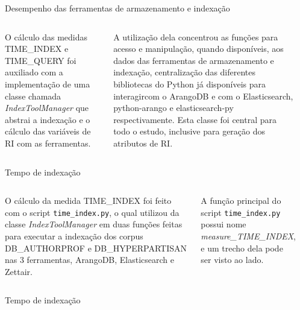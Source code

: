 \documentclass[%
  10pt,%
  aspectratio = 169,%
  compress,%
  t,%
]{beamer}%
\begin{document}
    \begin{frame}{}{Desempenho das ferramentas de armazenamento e indexação}
        \begin{columns}
            O cálculo das medidas TIME\_INDEX e TIME\_QUERY foi auxiliado com a implementação de uma classe chamada \textit{IndexToolManager} que abstrai a indexação e o cálculo das variáveis de RI com as ferramentas.
            
            A utilização dela concentrou as funções para acesso e manipulação, quando disponíveis, aos dados das ferramentas de armazenamento e indexação, centralização das diferentes bibliotecas do Python já disponíveis para interagircom o ArangoDB e com o Elasticsearch, python-arango e elasticsearch-py respectivamente.
            Esta classe foi central para todo o estudo, inclusive para geração dos atributos de RI.

                \vspace{-1.0cm}
                \inputminted[bgcolor=bg, fontsize=\scriptsize,
                baselinestretch=1, tabsize=2, breaklines]{python}{codes/indextoolmanager-reduced.py}
        \end{columns}
    \end{frame}
    
    \begin{frame}{}{Tempo de indexação}
        \begin{columns}
            O cálculo da medida TIME\_INDEX foi feito com o script \texttt{time\_index.py}, o qual utilizou da classe \textit{IndexToolManager} em duas funções feitas para executar a indexação dos corpus DB\_AUTHORPROF e DB\_HYPERPARTISAN nas 3 ferramentas, ArangoDB, Elasticsearch e Zettair.
            
            A função principal do script \texttt{time\_index.py} possui nome \textit{measure\_TIME\_INDEX}, e um trecho dela pode ser visto ao lado.

                \vspace{-1.0cm}
                \inputminted[bgcolor=bg, fontsize=\scriptsize,
                baselinestretch=1, tabsize=2, breaklines]{python}{codes/function-measure-TIME-INDEX.py}
        \end{columns}
    \end{frame}
    
    \begin{frame}{}{Tempo de indexação}
        \begin{columns}[T]
                \vspace{-0.5cm}
                
                \vspace{-0.5cm}
                
        \end{columns}
    \end{frame}
    
\end{document}
